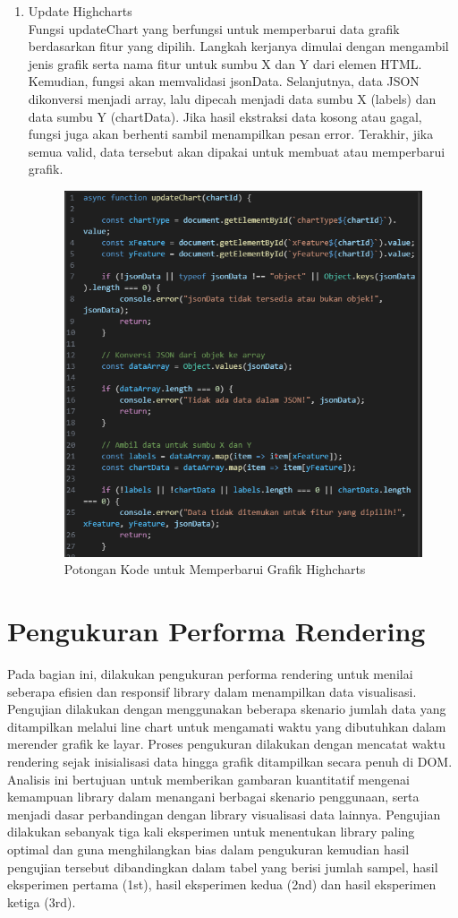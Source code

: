 \begin{enumerate}
\item Update Highcharts\\
 Fungsi updateChart yang berfungsi untuk memperbarui data grafik berdasarkan fitur yang dipilih. Langkah kerjanya dimulai dengan mengambil jenis grafik serta nama fitur untuk sumbu X dan Y dari elemen HTML. Kemudian, fungsi akan memvalidasi jsonData. Selanjutnya, data JSON dikonversi menjadi array, lalu dipecah menjadi data sumbu X (labels) dan data sumbu Y (chartData). Jika hasil ekstraksi data kosong atau gagal, fungsi juga akan berhenti sambil menampilkan pesan error. Terakhir, jika semua valid, data tersebut akan dipakai untuk membuat atau memperbarui grafik.
 		\begin{figure}[H]
 	\centering
 	\includegraphics[width=0.8\linewidth]{gambar/Pembahasan/Update Highcharts.png}
 	\caption{Potongan Kode untuk Memperbarui Grafik Highcharts}
 	\label{Potongan Kode untuk Memperbarui Grafik Highcharts}
 \end{figure}
\end{enumerate}


\section{Pengukuran Performa Rendering}
Pada bagian ini, dilakukan pengukuran performa rendering untuk menilai seberapa efisien dan responsif library dalam menampilkan data visualisasi. Pengujian dilakukan dengan menggunakan beberapa skenario jumlah data yang ditampilkan melalui line chart untuk mengamati waktu yang dibutuhkan dalam merender grafik ke layar. Proses pengukuran dilakukan dengan mencatat waktu rendering sejak inisialisasi data hingga grafik ditampilkan secara penuh di DOM. Analisis ini bertujuan untuk memberikan gambaran kuantitatif mengenai kemampuan library dalam menangani berbagai skenario penggunaan, serta menjadi dasar perbandingan dengan library visualisasi data lainnya. Pengujian dilakukan sebanyak tiga kali eksperimen untuk menentukan library paling optimal dan guna menghilangkan bias dalam pengukuran kemudian hasil pengujian tersebut dibandingkan dalam tabel yang berisi jumlah sampel, hasil eksperimen pertama (1st), hasil eksperimen kedua (2nd) dan hasil eksperimen ketiga (3rd). 

